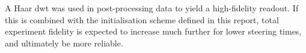 A Haar \gls{dwt} was used in post-processing data to yield a high-fidelity readout. If this is combined with the initialisation scheme defined in this report, total experiment fidelity is expected to increase much further for lower steering times, and ultimately be more reliable.



